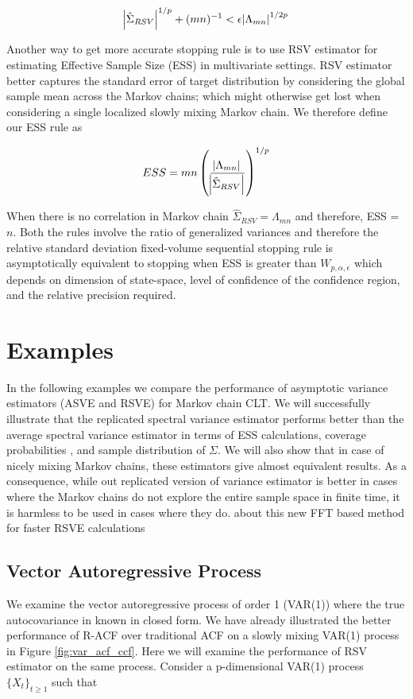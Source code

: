 \documentclass[12pt]{article}
\begin{document}
\[
\abs{\hat{\Sigma}_{RSV}}^{1/p} + (mn)^{-1} < \epsilon \abs{\Lambda_{mn}}^{1/2p}
\]

Another way to get more accurate stopping rule is to use RSV estimator for estimating Effective Sample Size (ESS) in multivariate settings. RSV estimator better captures the standard error of target distribution by considering the global sample mean across the Markov chains; which might otherwise get lost when considering a single localized slowly mixing Markov chain. We therefore define our ESS rule as

\[
ESS = mn\left(\dfrac{\abs{\Lambda_{mn}}}{\abs{\hat{\Sigma}_{RSV}}}\right)^{1/p}
\]

When there is no correlation in Markov chain $\hat{\Sigma}_{RSV} = \Lambda_{mn}$ and therefore, ESS = $n$. Both the rules involve the ratio of generalized variances and therefore the relative standard deviation fixed-volume sequential stopping rule is asymptotically equivalent to stopping when ESS is greater than $W_{p,\alpha,\epsilon}$ which depends on dimension of state-space, level of confidence of the confidence region, and the relative precision required. 

\section{Examples} \label{sec:examples}

In the following examples we compare the performance of asymptotic variance estimators (ASVE and RSVE) for Markov chain CLT. We will successfully illustrate that the replicated spectral variance estimator performs better than the average spectral variance estimator in terms of ESS calculations, coverage probabilities , and sample distribution of $\Sigma$. We will also show that in case of nicely mixing Markov chains, these estimators give almost equivalent results. As a consequence, while out replicated version of variance estimator is better in cases where the Markov chains do not explore the entire sample space in finite time, it is harmless to be used in cases where they do.  
{\color{red}about this new FFT based method for faster RSVE calculations}

\subsection{Vector Autoregressive Process} \label{ex:var}

We examine the vector autoregressive process of order 1 (VAR(1)) where the true autocovariance in known in closed form. We have already illustrated the better performance of R-ACF over traditional ACF on a slowly mixing VAR(1) process in Figure \ref{fig:var_acf_ccf}. Here we will examine the performance of RSV estimator on the same process. Consider a p-dimensional VAR(1) process $\{X_t\}_{t \geq 1}$ such that
\end{document}
